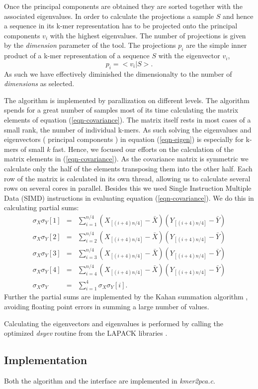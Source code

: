 Once the principal components are obtained they are sorted together
with the associated eigenvalues. In order to calculate the projections
a sample $S$ and hence a sequence in its k-mer representation has to be
projected onto the principal components $v_i$ with the highest
eigenvalues. The number of projections is given by the
\emph{dimension} parameter of the tool. The projections $p_i$ are the simple
inner product of a k-mer representation of a sequence $S$ with the
eigenvector $v_i$,
\begin{equation}
  p_i = <v_i|S>.
\end{equation}
As such we have effectively diminished the dimensionalty to the number of
\emph{dimensions} as selected.

The algorithm is implemented by parallization on different
levels. The algorithm spends for a great number of samples most of its
time calculating the matrix elements of equation
(\ref{eqn-covariance}). The matrix itself rests in most cases
of a small rank, the number of individual k-mers. As such solving the
eigenvalues and eigenvectors ( principal components ) in equation
(\ref{eqn-eigen}) is especially for k-mers of small $k$ fast. Hence, we
focused our efforts on the calculation of the matrix elements in
(\ref{eqn-covariance}). As the covariance matrix is symmetric we
calculate only the half of the elements transposing them into the
other half. Each row of the matrix is calculated in its own thread,
allowing us to calculate several rows on several cores in
parallel. Besides this we used Single Instruction Multiple Data (SIMD)
instructions in evaluating equation (\ref{eqn-covariance}). We do this
in calculating partial sums:
\begin{eqnarray}
  \sigma_X
  \sigma_Y[1]&=&\sum_{i=1}^{n/4}(X_{[(i+4)n/4]}-\bar{X})(Y_{[(i+4)n/4]}-\bar{Y}) \\
  \sigma_X
  \sigma_Y[2]&=&\sum_{i=2}^{n/4}(X_{[(i+4)n/4]}-\bar{X})(Y_{[(i+4)n/4]}-\bar{Y}) \\
  \sigma_X
  \sigma_Y[3]&=&\sum_{i=3}^{n/4}(X_{[(i+4)n/4]}-\bar{X})(Y_{[(i+4)n/4]}-\bar{Y}) \\
  \sigma_X
  \sigma_Y[4]&=&\sum_{i=4}^{n/4}(X_{[(i+4)n/4]}-\bar{X})(Y_{[(i+4)n/4]}-\bar{Y}) \\
  \sigma_X
  \sigma_Y &=& \sum_{i=1}^4\sigma_X\sigma_Y[i].
\end{eqnarray}
Further the partial sums are implemented by the Kahan summation
algorithm \cite{kahan}, avoiding floating point errors in summing a
large number of values.

Calculating the eigenvectors and eigenvalues is performed by calling
the optimized \emph{dsyev} routine from the LAPACK libraries \cite{lapack}.

\subsection{Implementation}

Both the algorithm and the interface are implemented in \emph{kmer2pca.c}.
